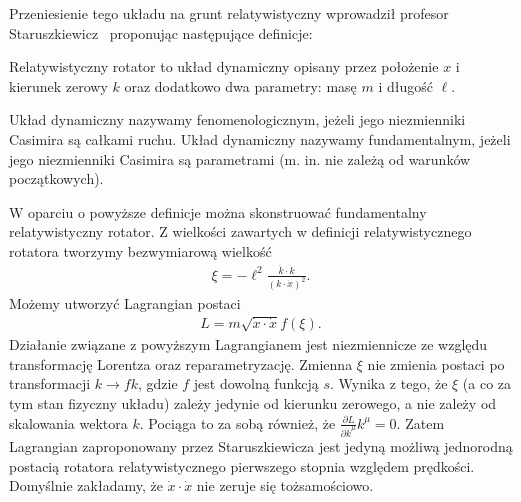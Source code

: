 Przeniesienie tego układu na grunt relatywistyczny wprowadził 
profesor Staruszkiewicz~\cite{star2008} proponując następujące 
definicje:
\begin{definition}
Relatywistyczny rotator to układ dynamiczny
 opisany przez położenie $x$ i kierunek
zerowy $k$ oraz dodatkowo dwa parametry: masę $m$ i długość $\ell$.
\end{definition}
\begin{definition}
Układ dynamiczny  nazywamy fenomenologicznym, 
jeżeli jego niezmienniki Casimira są 
całkami ruchu. Układ dynamiczny nazywamy 
fundamentalnym, jeżeli jego niezmienniki
Casimira są parametrami (m. in. nie zależą od warunków początkowych).
\end{definition}
W oparciu o powyższe definicje można skonstruować fundamentalny
relatywistyczny rotator. Z wielkości zawartych w definicji relatywistycznego 
rotatora tworzymy bezwymiarową wielkość
\begin{align*}
\xi = - \ell^2 \frac{\dot{k} \cdot \dot{k}}{ ( k \cdot \dot{x})^2 }.
\end{align*}
Możemy utworzyć Lagrangian postaci
\begin{align}\label{rotatorStar}
L = m \sqrt{ \dot{x} \cdot \dot{x} } f( \xi ) .
\end{align}
Działanie związane z powyższym Lagrangianem 
jest niezmiennicze ze względu transformację Lorentza oraz reparametryzację.
Zmienna $\xi$ nie zmienia postaci po transformacji $k \to f k$, gdzie $f$ 
jest dowolną funkcją $s$. Wynika z tego, że $\xi$ (a co za tym 
stan fizyczny układu)
zależy jedynie 
od kierunku zerowego, a nie zależy od skalowania wektora $k$.
Pociąga to za sobą również, że 
$\frac{\partial L}{\partial \dot{k}^\mu} k^\mu = 0$.
Zatem Lagrangian zaproponowany przez Staruszkiewicza jest jedyną 
możliwą jednorodną postacią
rotatora relatywistycznego pierwszego stopnia względem prędkości.  
Domyślnie zakładamy, że 
$\dot{x}\cdot \dot{x}$ nie zeruje się tożsamościowo.


